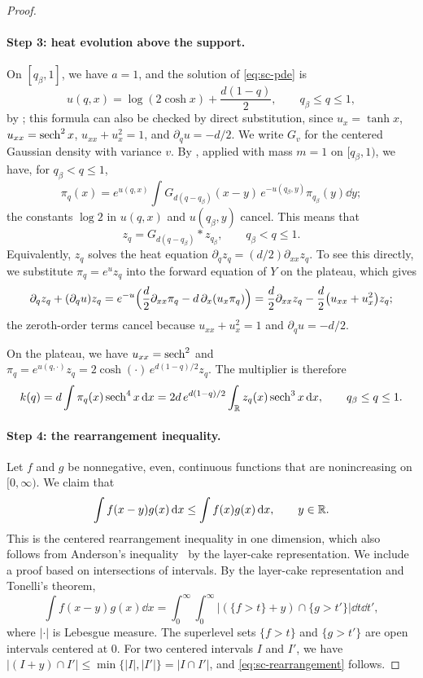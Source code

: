 \begin{proof}
\paragraph{Step 3: heat evolution above the support.}
On $[q_\beta,1]$, we have $a=1$, and the solution of \eqref{eq:sc-pde}
is
\[
 u(q,x)=\log(2\cosh x)+\frac{d(1-q)}2,\qquad q_\beta\le q\le1,
\]
by \cite[Lemma~2.4(i)]{Lopatto}; this formula can also be checked by
direct substitution, since $u_x=\tanh x$, $u_{xx}=\operatorname{sech}^2x$,
$u_{xx}+u_x^2=1$, and $\partial_qu=-d/2$. We write $G_v$ for the centered
Gaussian density with variance $v$. By \cite[Lemma~2.4(ii)]{Lopatto},
applied with mass $m=1$ on $[q_\beta,1)$, we have, for
$q_\beta<q\le1$,
\[
 \pi_q(x)=e^{u(q,x)}\int G_{d(q-q_\beta)}(x-y)\,e^{-u(q_\beta,y)}\pi_{q_\beta}(y)\dd y ;
\]
the constants $\log2$ in $u(q,x)$ and $u(q_\beta,y)$ cancel. This means
that
\begin{equation}\label{eq:sc-heat}
 z_q=G_{d(q-q_\beta)}*z_{q_\beta},\qquad q_\beta<q\le1 .
\end{equation}
Equivalently, $z_q$ solves the heat equation
$\partial_qz_q=(d/2)\partial_{xx}z_q$. To see this directly, we
substitute $\pi_q=e^{u}z_q$ into the forward equation of $Y$ on the
plateau, which gives
\[
 \partial_qz_q+(\partial_qu)z_q
 =e^{-u}\Bigl(\frac d2\partial_{xx}\pi_q-d\,\partial_x(u_x\pi_q)\Bigr)
 =\frac d2\partial_{xx}z_q-\frac d2\bigl(u_{xx}+u_x^2\bigr)z_q ;
\]
the zeroth-order terms cancel because $u_{xx}+u_x^2=1$ and
$\partial_qu=-d/2$.

On the plateau, we have $u_{xx}=\operatorname{sech}^2$ and
$\pi_q=e^{u(q,\cdot)}z_q=2\cosh(\cdot)\,e^{d(1-q)/2}z_q$. The multiplier
is therefore
\begin{equation}\label{eq:sc-k-plateau}
 k(q)=d\int\pi_q(x)\operatorname{sech}^4x\,\mathrm d x
 =2d\,e^{d(1-q)/2}\int_\mathbb R z_q(x)\operatorname{sech}^3x\,\mathrm d x,\qquad q_\beta\le q\le1 .
\end{equation}

\paragraph{Step 4: the rearrangement inequality.}
Let $f$ and $g$ be nonnegative, even, continuous functions that are
nonincreasing on $[0,\infty)$. We claim that
\begin{equation}\label{eq:sc-rearrangement}
 \int f(x-y)g(x)\,\mathrm d x\le\int f(x)g(x)\,\mathrm d x,\qquad y\in\mathbb R .
\end{equation}
This is the centered rearrangement inequality in one dimension, which
also follows from Anderson's inequality~\cite[Theorem~1]{Anderson1955}
by the layer-cake representation. We include a proof based on intersections of intervals.
By the layer-cake representation and Tonelli's theorem,
\[
 \int f(x-y)g(x)\dd x=\int_0^\infty\!\!\int_0^\infty
 \bigl|(\{f>t\}+y)\cap\{g>t'\}\bigr|\dd t\dd t',
\]
where $|\cdot|$ is Lebesgue measure. The superlevel sets $\{f>t\}$ and
$\{g>t'\}$ are open intervals centered at $0$. For two centered intervals
$I$ and $I'$, we have $|(I+y)\cap I'|\le\min\{|I|,|I'|\}=|I\cap I'|$, and
\eqref{eq:sc-rearrangement} follows.


\end{proof}
